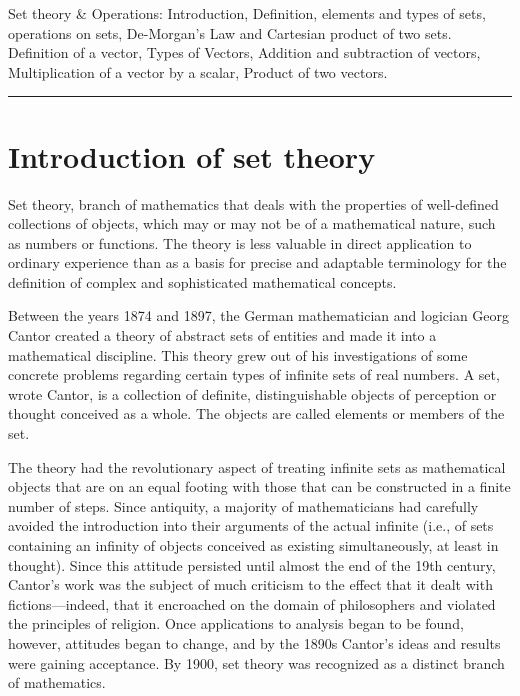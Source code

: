 \documentclass[
]{book}
\theoremstyle{definition}
\theoremstyle{definition}
\theoremstyle{definition}
\theoremstyle{definition}
\theoremstyle{remark}
\begin{document}
Set theory \& Operations: Introduction, Definition, elements and types of sets, operations on sets, De-Morgan's Law and Cartesian product of two sets. Definition of a vector, Types of Vectors, Addition and subtraction of vectors, Multiplication of a vector by a scalar, Product of two vectors.

\begin{center}\rule{0.5\linewidth}{0.5pt}\end{center}

\hypertarget{introduction-of-set-theory}{%
\section{Introduction of set theory}\label{introduction-of-set-theory}}

Set theory, branch of mathematics that deals with the properties of well-defined collections of objects, which may or may not be of a mathematical nature, such as numbers or functions. The theory is less valuable in direct application to ordinary experience than as a basis for precise and adaptable terminology for the definition of complex and sophisticated mathematical concepts.

Between the years 1874 and 1897, the German mathematician and logician Georg Cantor created a theory of abstract sets of entities and made it into a mathematical discipline. This theory grew out of his investigations of some concrete problems regarding certain types of infinite sets of real numbers. A set, wrote Cantor, is a collection of definite, distinguishable objects of perception or thought conceived as a whole. The objects are called elements or members of the set.

The theory had the revolutionary aspect of treating infinite sets as mathematical objects that are on an equal footing with those that can be constructed in a finite number of steps. Since antiquity, a majority of mathematicians had carefully avoided the introduction into their arguments of the actual infinite (i.e., of sets containing an infinity of objects conceived as existing simultaneously, at least in thought). Since this attitude persisted until almost the end of the 19th century, Cantor's work was the subject of much criticism to the effect that it dealt with fictions---indeed, that it encroached on the domain of philosophers and violated the principles of religion. Once applications to analysis began to be found, however, attitudes began to change, and by the 1890s Cantor's ideas and results were gaining acceptance. By 1900, set theory was recognized as a distinct branch of mathematics.
\end{document}
